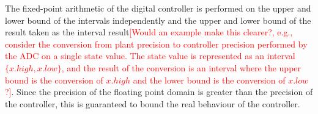 \documentclass[twocolumn]{autart}    %
\renewcommand{\note}[1]{\textcolor{red}{[#1]}}
\begin{document}
The fixed-point arithmetic of the digital controller is performed on the upper and lower bound of the intervals independently and the upper and lower bound of the result taken as the interval result\note{Would an example make this clearer?, e.g., consider the conversion from plant precision to controller precision performed by the ADC on a single state value. The state value is represented as an interval $\{x.high, x.low\}$, and the result of the conversion is an interval where the upper bound is the conversion of $x.high$ and the lower bound is the conversion of $x.low$?}. 
Since the precision of the floating point domain is greater than the precision of the controller, this is guaranteed to bound the real behaviour of the controller. 



\ifx\axelerator
\end{document}
